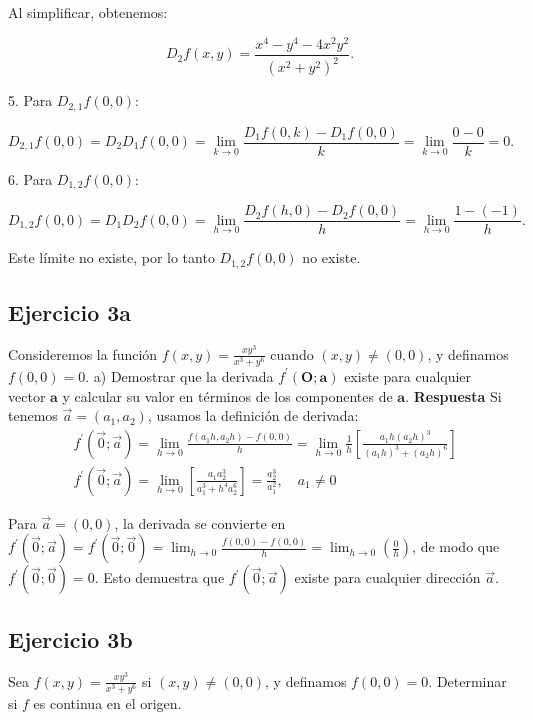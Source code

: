 \documentclass{report}
\begin{document}
    Al simplificar, obtenemos:

    \[ 
    D_2 f(x, y) = \frac{x^4 - y^4 - 4x^2 y^2}{(x^2 + y^2)^2}. 
    \]

    5. Para \( D_{2,1} f(0,0) \):

    \[ 
    D_{2,1} f(0,0) = D_2 D_1 f(0,0) = \lim_{k \to 0} \frac{D_1 f(0, k) - D_1 f(0, 0)}{k} = \lim_{k \to 0} \frac{0 - 0}{k} = 0. 
    \]

    6. Para \( D_{1,2} f(0,0) \):

    \[ 
    D_{1,2} f(0,0) = D_1 D_2 f(0,0) = \lim_{h \to 0} \frac{D_2 f(h, 0) - D_2 f(0, 0)}{h} = \lim_{h \to 0} \frac{1 - (-1)}{h}. 
    \]

    Este límite no existe, por lo tanto \( D_{1,2} f(0,0) \) no existe.\subsection*{Ejercicio 3a}
    Consideremos la función $f(x, y)=\frac{x y^{3}}{x^{3}+y^{6}}$ cuando $(x, y) \neq (0,0)$, y definamos $f(0,0)=0$. 
    a) Demostrar que la derivada $f^{\prime}(\boldsymbol{O} ; \boldsymbol{a})$ existe para cualquier vector $\boldsymbol{a}$ y calcular su valor en términos de los componentes de $\boldsymbol{a}$.
    \textbf{Respuesta}
    Si tenemos $\vec{a}=(a_1, a_2)$, usamos la definición de derivada:
    $$
    \begin{aligned}
    & f^{\prime}(\vec{0} ; \vec{a}) = \lim _{h \rightarrow 0} \frac{f(a_1 h, a_2 h) - f(0,0)}{h} = \lim _{h \rightarrow 0} \frac{1}{h} \left[\frac{a_1 h (a_2 h)^3}{(a_1 h)^3 + (a_2 h)^6}\right] \\
    & f^{\prime}(\vec{0} ; \vec{a}) = \lim _{h \rightarrow 0} \left[\frac{a_1 a_2^3}{a_1^3 + h^4 a_2^6}\right] = \frac{a_2^3}{a_1^2}, \quad a_1 \neq 0
    \end{aligned}
    $$

    Para $\vec{a} = (0,0)$, la derivada se convierte en $f^{\prime}(\vec{0} ; \vec{a}) = f^{\prime}(\vec{0} ; \vec{0}) = \lim _{h \rightarrow 0} \frac{f(0,0) - f(0,0)}{h} = \lim _{h \rightarrow 0} \left(\frac{0}{h}\right)$,
    de modo que $f^{\prime}(\vec{0} ; \vec{0}) = 0$. Esto demuestra que $f^{\prime}(\vec{0} ; \vec{a})$ existe para cualquier dirección $\vec{a}$.\subsection*{Ejercicio 3b}
    Sea $f(x, y)=\frac{x y^{3}}{x^{3}+y^{6}}$ si $(x, y) \neq (0,0)$, y definamos $f(0,0)=0$. 
    Determinar si $f$ es continua en el origen.
\end{document}
